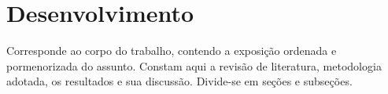 \chapter{Desenvolvimento}

Corresponde ao corpo do trabalho, contendo a exposição ordenada e pormenorizada
do assunto. Constam aqui a revisão de literatura, metodologia adotada, os resultados e
sua discussão. Divide-se em seções e subseções. \cite{Robert2007}
